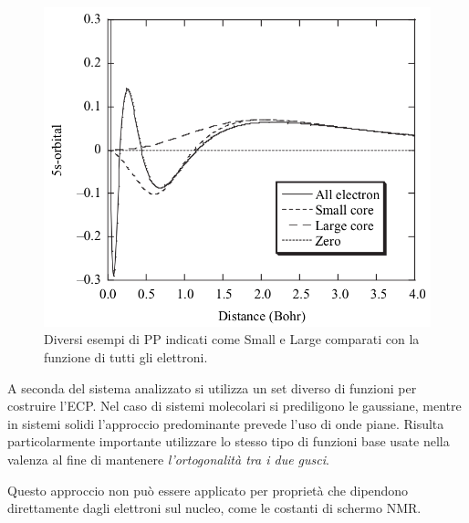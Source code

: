 \documentclass[oneside]{amsbook}
\numberwithin{section}{chapter}
\numberwithin{equation}{section}
\numberwithin{figure}{section}
\begin{document}
\begin{figure}[H]
\centering
\caption{Diversi esempi di PP indicati come Small e Large comparati con la funzione di tutti gli elettroni.}\label{ecoz}
\includegraphics[scale=0.3]{ecp}
\end{figure}

A seconda del sistema analizzato si utilizza un set diverso di funzioni per costruire l'ECP. Nel caso di sistemi molecolari si prediligono le gaussiane, mentre in sistemi solidi l'approccio predominante prevede l'uso di onde piane. Risulta particolarmente importante utilizzare lo stesso tipo di funzioni base usate nella valenza al fine di mantenere \emph{l'ortogonalità tra i due gusci}.

Questo approccio non può essere applicato per proprietà che dipendono direttamente dagli elettroni sul nucleo, come le costanti di schermo NMR.
\end{document}
